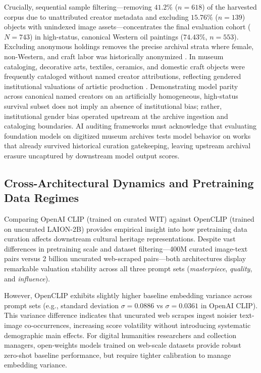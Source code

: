 \documentclass[pdflatex,sn-mathphys-num]{sn-jnl}%
\theoremstyle{thmstyleone}%
\theoremstyle{thmstyletwo}%
\theoremstyle{thmstylethree}%
\begin{document}
Crucially, sequential sample filtering—removing $41.2\%$ ($n=618$) of the harvested corpus due to unattributed creator metadata and excluding $15.76\%$ ($n=139$) objects with unindexed image assets—concentrates the final evaluation cohort ($N=743$) in high-status, canonical Western oil paintings ($74.43\%$, $n=553$). Excluding anonymous holdings removes the precise archival strata where female, non-Western, and craft labor was historically anonymized \cite{bailey2020gender, parker1984subversive}. In museum cataloging, decorative arts, textiles, ceramics, and domestic craft objects were frequently cataloged without named creator attributions, reflecting gendered institutional valuations of artistic production \cite{nochlin1971why, pollock1988vision}. Demonstrating model parity across canonical named creators on an artificially homogeneous, high-status survival subset does not imply an absence of institutional bias; rather, institutional gender bias operated upstream at the archive ingestion and cataloging boundaries. AI auditing frameworks must acknowledge that evaluating foundation models on digitized museum archives tests model behavior on works that already survived historical curation gatekeeping, leaving upstream archival erasure uncaptured by downstream model output scores.

\subsection{Cross-Architectural Dynamics and Pretraining Data Regimes}
Comparing OpenAI CLIP (trained on curated WIT) against OpenCLIP (trained on uncurated LAION-2B) provides empirical insight into how pretraining data curation affects downstream cultural heritage representations. Despite vast differences in pretraining scale and dataset filtering—400M curated image-text pairs versus 2 billion uncurated web-scraped pairs—both architectures display remarkable valuation stability across all three prompt sets (\textit{masterpiece}, \textit{quality}, and \textit{influence}).

However, OpenCLIP exhibits slightly higher baseline embedding variance across prompt sets (e.g., standard deviation $\sigma = 0.0886$ vs $\sigma = 0.0361$ in OpenAI CLIP). This variance difference indicates that uncurated web scrapes ingest noisier text-image co-occurrences, increasing score volatility without introducing systematic demographic main effects. For digital humanities researchers and collection managers, open-weights models trained on web-scale datasets provide robust zero-shot baseline performance, but require tighter calibration to manage embedding variance.
\end{document}
